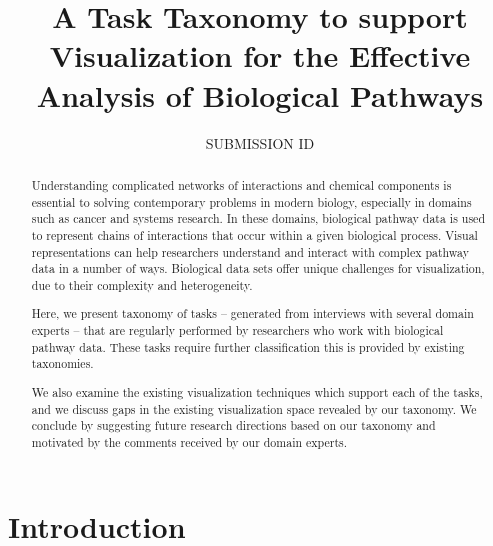\documentclass{egpubl}
\title[A Task Taxonomy to support Visualization for the Effective Analysis of Biological Pathways]%
      {A Task Taxonomy to support Visualization for the Effective Analysis of Biological Pathways}
\author[]{SUBMISSION ID}
\begin{document}

\maketitle

\begin{abstract}
Understanding complicated networks of interactions and chemical components is essential to solving contemporary problems in modern biology, especially in domains such as cancer and systems research.
In these domains, biological pathway data is used to represent chains of interactions that occur within a given biological process.
Visual representations can help researchers understand and interact with complex pathway data in a number of ways.
Biological data sets offer unique challenges for visualization, due to their complexity and heterogeneity.

Here, we present taxonomy of tasks -- generated from interviews with several domain experts -- that are regularly performed by researchers who work with biological pathway data.
These tasks require further classification this is provided by existing taxonomies.


We also examine the existing visualization techniques which support each of the tasks, and we discuss gaps in the existing visualization space revealed by our taxonomy.
We conclude by suggesting future research directions based on our taxonomy and motivated by the comments received by our domain experts.


\begin{classification} %
\end{classification}

\end{abstract}

\section{Introduction}
\end{document}
